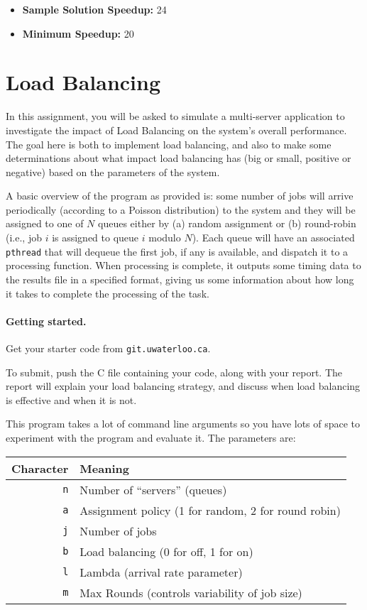 \documentclass[letterpaper,10pt]{article}
\begin{document}
\begin{itemize}
\item \textbf{Sample Solution Speedup:} 24
\item \textbf{Minimum Speedup:} 20
\end{itemize}

\section{Load Balancing}

In this assignment, you will be asked to simulate a multi-server application to investigate the impact of Load Balancing on the system's overall performance. The goal here is both to implement load balancing, and also to make some determinations about what impact load balancing has (big or small, positive or negative) based on the parameters of the system. 

A basic overview of the program as provided is: some number of jobs will arrive periodically (according to a Poisson distribution) to the system and they will be assigned to one of $N$ queues either by (a) random assignment or (b) round-robin (i.e., job $i$ is assigned to queue $i$ modulo $N$). Each queue will have an associated \texttt{pthread} that will dequeue the first job, if any is available, and dispatch it to a processing function. When processing is complete, it outputs some timing data to the results file in a specified format, giving us some information about how long it takes to complete the processing of the task.


\paragraph{Getting started.} Get your starter code from \texttt{git.uwaterloo.ca}.

To submit, push the C file containing your code, along with your report. The report will explain your load balancing strategy, and discuss when load balancing is effective and when it is not.

This program takes a lot of command line arguments so you have lots of space to experiment with the program and evaluate it. The parameters are:

\begin{center}
	\begin{tabular}{r|l}
	\textbf{Character} & \textbf{Meaning} \\ \hline
	\texttt{n} & Number of ``servers'' (queues) \\
	\texttt{a} & Assignment policy (1 for random, 2 for round robin) \\
	\texttt{j} & Number of jobs \\
	\texttt{b} & Load balancing (0 for off, 1 for on) \\
	\texttt{l} & Lambda (arrival rate parameter) \\
	\texttt{m} & Max Rounds (controls variability of job size) \\
	\end{tabular}
\end{center}
\end{document}
